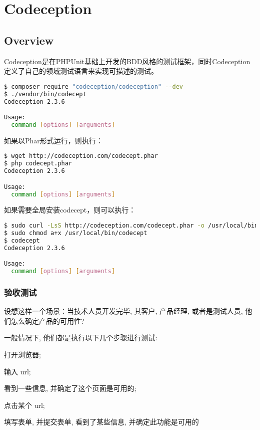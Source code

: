 \part{Codeception}


\chapter{Overview}




Codeception是在PHPUnit基础上开发的BDD风格的测试框架，同时Codeception定义了自己的领域测试语言来实现可描述的测试。


\begin{lstlisting}[language=bash]
$ composer require "codeception/codeception" --dev
$ ./vendor/bin/codecept
Codeception 2.3.6

Usage:
  command [options] [arguments]
\end{lstlisting}

如果以Phar形式运行，则执行：

\begin{lstlisting}[language=bash]
$ wget http://codeception.com/codecept.phar
$ php codecept.phar
Codeception 2.3.6

Usage:
  command [options] [arguments]
\end{lstlisting}

如果需要全局安装codecept，则可以执行：

\begin{lstlisting}[language=bash]
$ sudo curl -LsS http://codeception.com/codecept.phar -o /usr/local/bin/codecept
$ sudo chmod a+x /usr/local/bin/codecept
$ codecept
Codeception 2.3.6

Usage:
  command [options] [arguments]
\end{lstlisting}



\section{验收测试}


设想这样一个场景：当技术人员开发完毕, 其客户, 产品经理, 或者是测试人员, 他们怎么确定产品的可用性? 

一般情况下, 他们都是执行以下几个步骤进行测试:

\begin{compactenum}
\item 打开浏览器;
\item 输入 url;
\item 看到一些信息, 并确定了这个页面是可用的;
\item 点击某个 url;
\item 填写表单, 并提交表单, 看到了某些信息, 并确定此功能是可用的
\end{compactenum}

